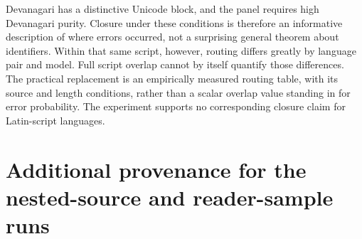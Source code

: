 \documentclass[final]{clv2025}
\begin{document}
Devanagari has a distinctive Unicode block, and the panel requires high Devanagari purity. Closure under these conditions is therefore an informative description of where errors occurred, not a surprising general theorem about identifiers. Within that same script, however, routing differs greatly by language pair and model. Full script overlap cannot by itself quantify those differences. The practical replacement is an empirically measured routing table, with its source and length conditions, rather than a scalar overlap value standing in for error probability. The experiment supports no corresponding closure claim for Latin-script languages.

\FloatBarrier
\section{Additional provenance for the nested-source and reader-sample runs}


\FloatBarrier
\end{document}
